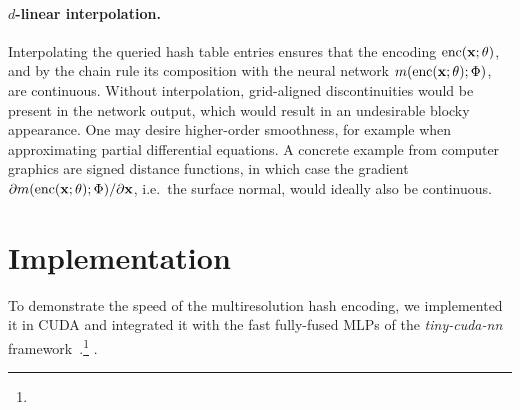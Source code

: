 \documentclass[acmtog,authorversion]{acmart}
\begin{document}
\paragraph{$d$-linear interpolation.}
Interpolating the queried hash table entries ensures that the encoding $\mathrm{enc}(\mathbf{x}; \theta)$, and by the chain rule its composition with the neural network $m(\mathrm{enc}(\mathbf{x}; \theta); \Phi)$, are continuous.
Without interpolation, grid-aligned discontinuities would be present in the network output, which would result in an undesirable blocky appearance.
One may desire higher-order smoothness, for example when approximating partial differential equations.
A concrete example from computer graphics are signed distance functions, in which case the gradient $\partial m(\mathrm{enc}(\mathbf{x}; \theta); \Phi) / \partial \mathbf{x}$, i.e.\ the surface normal, would ideally also be continuous.


\section{Implementation}\label{Sec:Implementation}

To demonstrate the speed of the multiresolution hash encoding, we implemented it in CUDA and integrated it with the fast fully-fused MLPs of the \emph{tiny-cuda-nn} framework~\cite{tiny-cuda-nn}.\footnote{}
.
\end{document}
